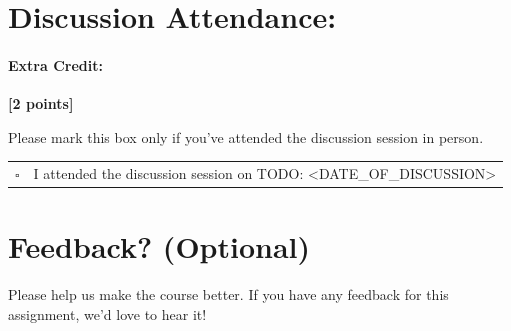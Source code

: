 \documentclass[11pt]{article}
\begin{document}
\pagebreak
\section*{Discussion Attendance:}
\paragraph{Extra Credit:} \textbf{[2 points]}

Please mark this box only if you've attended the discussion session in person.

\begin{tabular}[h]{ll}
$\square$ & I attended the discussion session on TODO: <DATE_OF_DISCUSSION> \\
\end{tabular}


\pagebreak
\section*{Feedback? (Optional)}
Please help us make the course better. If you have any feedback for this assignment, we'd love to hear it!
\end{document}
